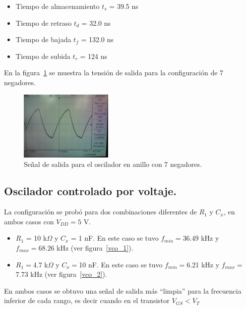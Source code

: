 \documentclass[twocolumn]{IEEEtran}
\begin{document}
\begin{itemize}
	\item Tiempo de almacenamiento $t_s$ = 39.5 ns 
	\item Tiempo de retraso $t_d$ = 32.0 ns
	\item Tiempo de bajada $t_f$ = 132.0 ns
	\item Tiempo de subida $t_r$ = 124 ns	
\end{itemize}

En la figura~\ref{anillo1} se muestra la tensión de salida para la configuración de 7 negadores. 

\begin{figure}[H]%
\centering
	\includegraphics[width=0.40\textwidth]{WP_000051.jpg}
	\caption{Señal de salida para el oscilador en anillo con 7 negadores.}
	
	\label{anillo1}

\end{figure}

\subsection{Oscilador controlado por voltaje.}
La configuración se probó para dos combinaciones diferentes de $R_1$ y $C_x$, en ambos casos con $V_{DD}=5$ V.

\begin{itemize}
	\item $R_1$ = 10 k$\Omega$ y $C_x$ = 1 nF. En este caso se tuvo $f_{min}=36.49$ kHz y $f_{max}=68.26$ kHz (ver figura~\ref{vco_1}).
	\item $R_1=$4.7 k$\Omega$ y $C_x=$10 nF. En este caso se tuvo $f_{min}=$6.21 kHz y $f_{max}=$7.73 kHz (ver figura~\ref{vco_2}).
\end{itemize}

En ambos casos se obtuvo una señal de salida más ``limpia'' para la frecuencia inferior de cada rango, es decir cuando en el transistor $V_{GS}<V_T$

\end{document}
